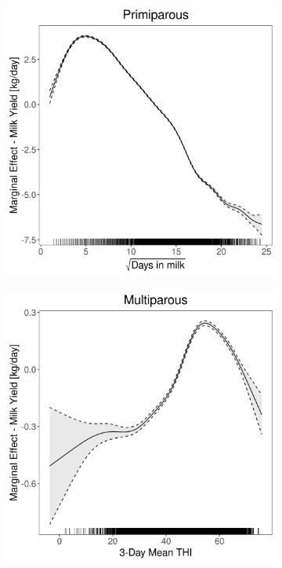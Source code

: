 \begin{figure}[H]
\begin{subfigure}[b]{0.45\textwidth}
    \end{subfigure}
    \hspace{0.05\textwidth} %
    \begin{subfigure}[b]{0.45\textwidth}
        \centering
        \includegraphics[width=\textwidth]{thesis/figures/models/milk/full/ob_milk_full/ob_milk_full_marginal_dim_milk_primi.png}
    \end{subfigure}
    \begin{subfigure}[b]{0.45\textwidth}
        \centering
        \includegraphics[width=\textwidth]{thesis/figures/models/milk/full/ob_milk_full/ob_milk_full_marginal_thi_milk_multi.png}

\end{subfigure}
\end{figure}
